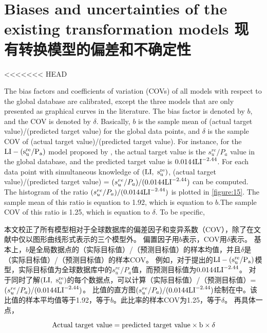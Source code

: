 \section{Biases and uncertainties of the existing transformation models 现有转换模型的偏差和不确定性}

<<<<<<< HEAD
\begin{paracol}{2}
    
    The bias factors and coefficients of variation (COVs) of all models with respect to the global database are calibrated, except the three models that are only presented as graphical curves in the literature. The bias factor is denoted by $b$, and the COV is denoted by $\delta$. Basically, $b$ is the sample mean of (actual target value)/(predicted target value) for the global data points, and $\delta$ is the sample COV of (actual target value)/(predicted target value). For instance, for the $\rm{LI}-(s_u^{re}/P_a)$ model proposed by \citet{Locat1988799}, the actual target value is the $s_u^{re}/P_a$ value in the global database, and the predicted target value is $0.0144\rm{LI}^{-2.44}$. For each data point with simultaneous knowledge of $(\rm{LI},~s_u^{re})$, (actual target value)/(predicted target value) = $(s_u^{re}/P_a)/(0.0144\rm{LI}^{-2.44})$ can be computed. The histogram of the ratio $(s_u^{re}/P_a)/(0.0144\rm{LI}^{-2.44})$ is plotted in \autoref{figure:15}. The sample mean of this ratio is equation to 1.92, which is equation to $b$.The sample COV of this ratio is 1.25, which is  equation to $\delta$. To be specific,
    
    \switchcolumn
    
    本文校正了所有模型相对于全球数据库的偏差因子和变异系数（COV），除了在文献中仅以图形曲线形式表示的三个模型外。 偏置因子用$b$表示，COV用$\delta$表示。 基本上，$b$是全局数据点的（实际目标值）/（预测目标值）的样本均值，并且$\delta$是（实际目标值）/（预测目标值）的样本COV。 例如，对于\citet{Locat1988799}提出的$\rm{LI}-(s_u^{re}/P_a)$模型，实际目标值为全球数据库中的$s_u^{re}/P_a$值，而预测目标值为$0.0144\rm{LI}^{-2.44}$。 对于同时了解$(\rm{LI},~s_u^{re})$的每个数据点，可以计算（实际目标值）/（预测目标值）= $(s_u^{re}/P_a)/(0.0144\rm{LI}^{-2.44})$。 比值的直方图$(s_u^{re}/P_a)/(0.0144\rm{LI}^{-2.44})$绘制在中。该比值的样本平均值等于1.92，等于$b$。此比率的样本COV为1.25，等于$\delta$。 再具体一点，
\end{paracol}

\begin{equation}
    \rm{Actual~ target~value = predicted~target~value\times{}b\times{}\delta}
    \label{equation:1}
\end{equation}


